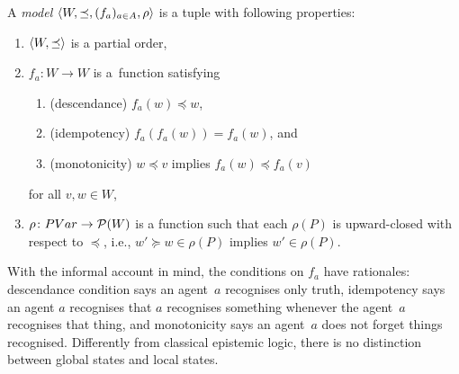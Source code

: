 \newcommand{\model}[1]{\tuple{W#1, \preceq#1, (f_a#1)_{a\in A}, \rho#1}}
\begin{definition}
\label{model}
 A \textit{model} $\langle{W,\preceq, (f_a)_{a\in A}, \rho}\rangle$ is a tuple with following properties:
\begin{enumerate}
 \item $\langle{W,\preceq}\rangle$ is a partial order,
 \item $f_a\colon W\rightarrow W$ is a~function satisfying
\begin{enumerate}
 \item (descendance) $f_a(w) \preceq w$,
 \item (idempotency) $f_a(f_a(w)) = f_a(w)$, and
 \item (monotonicity) $w\preceq v$ implies $f_a(w)\preceq f_a(v)$
\end{enumerate}
       for all $v,w\in W$,
 \item $\rho\colon PVar\rightarrow {\mathcal P({W})}$ is a function such that each $\rho(P)$ is
       upward-closed with respect to $\preceq$, i.e., $w'\succeq w\in\rho(P)$ implies
       $w'\in\rho(P)$.
\end{enumerate}
\end{definition}
\noindent With the informal account in mind, the conditions on $f_a$ have rationales:
descendance condition says an agent~$a$ recognises only truth, 
idempotency says an agent $a$ recognises that 
       $a$ recognises something whenever the agent~$a$ recognises that thing,
and monotonicity says an agent~$a$ does not forget things recognised.
Differently from classical epistemic logic,
there is no distinction between global states and local states.

